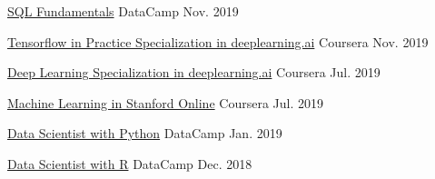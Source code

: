 \begin{cvhonors}

  \cvhonor
    {} %
    {\href{https://www.datacamp.com/statement-of-accomplishment/track/d05bff099253e5f221288f01272b0afb6eb80e05}{SQL Fundamentals}} %
    {DataCamp} %
    {Nov. 2019} %

  \cvhonor
    {} %
    {\href{https://www.coursera.org/account/accomplishments/specialization/certificate/JUYCQBR3TMVW?utm_medium=certificate&utm_source=link&utm_campaign=copybutton_certificate}{Tensorflow in Practice Specialization in deeplearning.ai}} %
    {Coursera} %
    {Nov. 2019} %

  \cvhonor
    {} %
    {\href{https://www.coursera.org/account/accomplishments/specialization/certificate/TG88EP6ASTZ7?utm_medium=certificate&utm_source=link&utm_campaign=copybutton_certificate}{Deep Learning Specialization in deeplearning.ai}} %
    {Coursera} %
    {Jul. 2019} %

  \cvhonor
    {} %
    {\href{https://www.coursera.org/account/accomplishments/certificate/T4ARKFWRSLB2?utm_medium=certificate&utm_source=link&utm_campaign=copybutton_certificate}{Machine Learning in Stanford Online}} %
    {Coursera} %
    {Jul. 2019} %


  \cvhonor
    {} %
    {\href{https://www.datacamp.com/statement-of-accomplishment/track/a31b1837666595d34f5378a093df9fa2056e29e2}{Data Scientist with Python}} %
    {DataCamp} %
    {Jan. 2019} %

  \cvhonor
    {} %
    {\href{https://www.datacamp.com/statement-of-accomplishment/track/dfdda8840e45bd7989991aa90b1287ed8fbbb872}{Data Scientist with R}} %
    {DataCamp} %
    {Dec. 2018} %


\end{cvhonors}